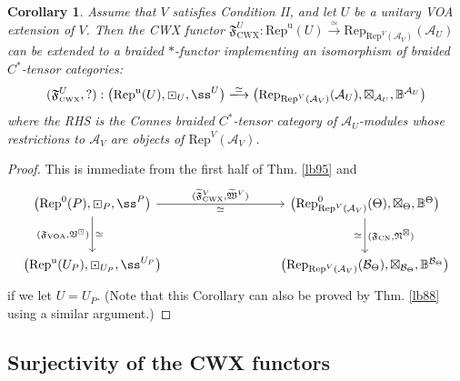 \documentclass[11pt,b5paper,notitlepage]{article}
\theoremstyle{definition}
\theoremstyle{plain}
\newtheorem{co}[df]{Corollary}
\newcommand{\fk}{\mathfrak}
\newcommand{\mc}{\mathcal}
\newcommand{\wtd}{\widetilde}
\newcommand{\Rep}{\mathrm{Rep}}
\newcommand{\uni}{\mathrm{u}}
\newcommand{\RepV}{{\mathrm{Rep}^\uni(V)}}
\newcommand{\RepU}{\mathrm{Rep}^\uni(U)}
\newcommand{\mbb}{\mathbb}
\newcommand{\CWX}{{\scriptscriptstyle \mathrm{CWX}}}
\newcommand{\tFVCWX}{{\widetilde{\mathfrak F}^V_{\scriptscriptstyle \mathrm{CWX}}}}
\newcommand{\VOA}{{\scriptscriptstyle \mathrm{VOA}}}
\newcommand{\CN}{{\scriptscriptstyle \mathrm{CN}}}
\newcommand{\RepUP}{\mathrm{Rep}^{\mathrm u}(U_P)}
\numberwithin{equation}{section}
\begin{document}



\begin{co}\label{lb96}
Assume that $V$ satisfies Condition II, and let $U$ be a unitary VOA extension of $V$. Then the CWX functor $\fk F^U_\CWX:\RepU\xrightarrow{\simeq}\Rep_{\Rep^V(\mc A_V)}(\mc A_U)$ can be extended to a braided $*$-functor implementing an isomorphism of braided $C^*$-tensor categories:
\begin{align*}
(\fk F^U_\CWX,?):\big(\RepU,\boxdot_U,\ss^U\big)\xlongrightarrow{\simeq} \big(\Rep_{\Rep^V(\mc A_V)}(\mc A_U),\boxtimes_{\mc A_U},\mathbb B^{\mc A_U} \big) 
\end{align*}
where the RHS is the Connes braided $C^*$-tensor category of $\mc A_U$-modules whose restrictions to $\mc A_V$ are objects of $\Rep^V(\mc A_V)$.
\end{co}

\begin{proof}
This is immediate from the first half of Thm. \ref{lb95} and
\begin{equation}
\begin{tikzcd}[row sep=large,column sep=3cm]
\big(\Rep^0(P),\boxdot_P,\ss^P\big) \arrow[r,"{(\tFVCWX,\wtd{\fk W}^V)}","\simeq"'] \arrow[d,"{(\fk F_\VOA,\fk V^\boxdot)}"',"\simeq"] & \big(\Rep^0_{\Rep^V(\mc A_V)}(\Theta),\boxtimes_\Theta,\mathbb B^\Theta \big)\arrow[d,"{(\fk F_\CN,\fk N^\boxtimes)}","\simeq"'] \\
\big(\RepUP,\boxdot_{U_P},\ss^{U_P} \big)     & \big(\Rep_{\Rep^V(\mc A_V)}(\mc B_\Theta),\boxtimes_{\mc B_\Theta},\mathbb B^{\mc B_\Theta} \big)         
\end{tikzcd}
\end{equation}
if we let $U=U_P$. (Note that this Corollary can also be proved by Thm. \ref{lb88} using a similar argument.)
\end{proof}



\subsection{Surjectivity of the CWX functors}
\end{document}
